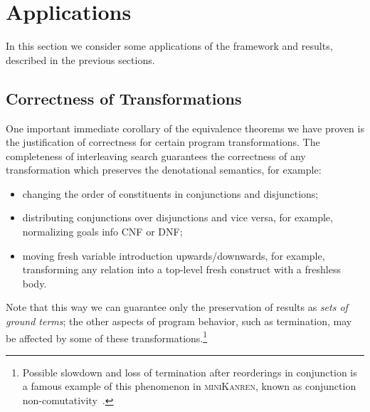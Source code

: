 \section{Applications}
\label{applications}

In this section we consider some applications of the framework and results, described in the previous sections.

\subsection{Correctness of Transformations}

One important immediate corollary of the equivalence theorems we have proven is the justification of correctness for certain program transformations.
The completeness of interleaving search guarantees the correctness of any transformation which preserves the denotational semantics,
for example:

\begin{itemize}
\item changing the order of constituents in conjunctions and disjunctions;
\item distributing conjunctions over disjunctions and vice versa, for example, normalizing goals info CNF or DNF;
\item moving fresh variable introduction upwards/downwards, for example, transforming any relation into a top-level fresh
  construct with a freshless body.
\end{itemize}

Note that this way we can guarantee only the preservation of results as \emph{sets of ground terms}; the other aspects of program behavior,
such as termination, may be affected by some of these transformations.\footnote{Possible slowdown and loss of termination after reorderings in conjunction is a famous example of this phenomenon in \textsc{miniKanren}, known as conjunction non-comutativity~\cite{WillThesis}.}

